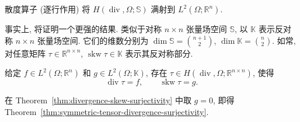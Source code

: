 
\begin{Theorem}\label{thm:symmetric-tensor-divergence-surjectivity}
{散度算子 (逐行作用) 将 $H(\operatorname{div},\Omega;\mathbb S)$ 满射到 $L^2(\Omega;\mathbb R^n)$.}
\end{Theorem}

{事实上, 将证明一个更强的结果. 类似于对称 $n\times n$ 张量场空间 $\mathbb S$, 以 $\mathbb K$ 表示反对称 $n\times n$ 张量场空间. 它们的维数分别为 $\dim\mathbb S=\binom{n+1}2$, $\dim\mathbb K=\binom n2$. 如常, 对任意矩阵 $\tau\in\mathbb R^{n\times n}$, $\operatorname{skw}\tau\in\mathbb K$ 表示其反对称部分.}


\begin{Theorem}\label{thm:divergence-skew-surjectivity}
{给定 $f\in L^2(\Omega;\mathbb R^n)$ 和 $g\in L^2(\Omega;\mathbb K)$, 存在 $\tau\in H(\operatorname{div},\Omega;\mathbb R^{n\times n})$, 使得}
\[
\operatorname{div}\tau=f,\qquad\operatorname{skw}\tau=g.
\]
\end{Theorem}

{在 Theorem~\ref{thm:divergence-skew-surjectivity} 中取 $g=0$, 即得 Theorem~\ref{thm:symmetric-tensor-divergence-surjectivity}.}

